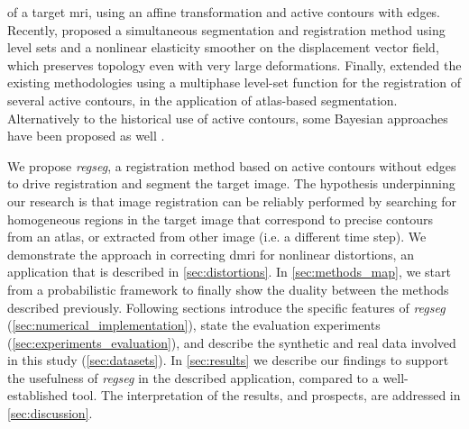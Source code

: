   of a target \gls*{mri}, using an affine transformation and active contours with edges.
Recently, \cite{guyader_combined_2011} proposed a simultaneous segmentation and
  registration method using level sets and a nonlinear elasticity smoother on the
  displacement vector field, which preserves topology even with very large deformations.
Finally, \cite{gorthi_active_2011} extended the existing methodologies using a multiphase
  level-set function for the registration of several active contours, in the application
  of atlas-based segmentation.
Alternatively to the historical use of active contours, some Bayesian approaches
  have been proposed as well \citep{wyatt_map_2003,pohl_bayesian_2006,gass_simultaneous_2014}.

We propose \emph{regseg}, a registration method based on active contours without edges
  \citep{chan_active_2001} to drive registration and segment the target image.
The hypothesis underpinning our research is that image registration can be reliably performed
  by searching for homogeneous regions in the target image that correspond to precise contours
  from an atlas, or extracted from other image (i.e. a different time step).
We demonstrate the approach in correcting \gls*{dmri} for nonlinear distortions, an application
  that is described in \autoref{sec:distortions}.
In \autoref{sec:methods_map}, we start from a probabilistic framework to finally show the duality
  between the methods described previously.
Following sections introduce
  the specific features of \emph{regseg} (\autoref{sec:numerical_implementation}),
  state the evaluation experiments (\autoref{sec:experiments_evaluation}),
  and describe the synthetic and real data involved in this study (\autoref{sec:datasets}).
In \autoref{sec:results} we describe our findings to support the usefulness of \emph{regseg}
  in the described application, compared to a well-established tool.
The interpretation of the results, and prospects, are addressed in \autoref{sec:discussion}.


